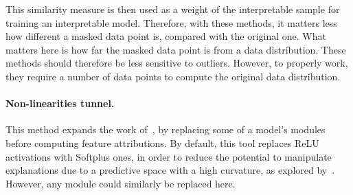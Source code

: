 This similarity measure is then used as a weight of the interpretable sample for training an interpretable model.
Therefore, with these methods, it matters less how different a masked data point is, compared with the original one.
What matters here is how far the masked data point is from a data distribution.
These methods should therefore be less sensitive to outliers.
However, to properly work, they require a number of data points to compute the original data distribution.


\paragraph{Non-linearities tunnel.}

This method expands the work of~\citep{dombrowski2019explanations}, by replacing some of a model's modules before
computing feature attributions.
By default, this tool replaces ReLU activations with Softplus ones, in order to reduce the potential to manipulate
explanations due to a predictive space with a high curvature, as explored by~\citep{dombrowski2019explanations}.
However, any module could similarly be replaced here.
